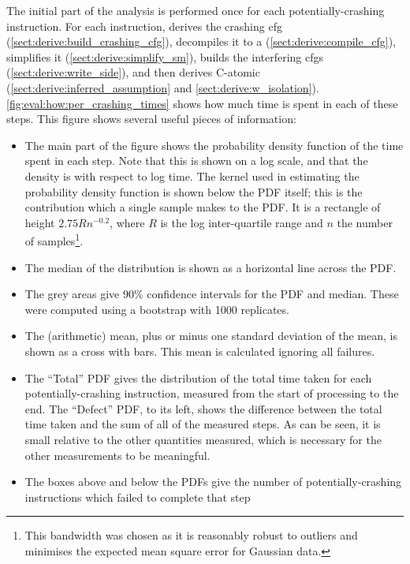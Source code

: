 \noindent
The initial part of the analysis is performed once for each
potentially-crashing instruction.  For each instruction, {\technique}
derives the crashing \gls{cfg}
(\autoref{sect:derive:build_crashing_cfg}), decompiles it to a
{\StateMachine} (\autoref{sect:derive:compile_cfg}), simplifies it
(\autoref{sect:derive:simplify_sm}), builds the interfering
\glspl{cfg} (\autoref{sect:derive:write_side}), and then derives
C-atomic (\autoref{sect:derive:inferred_assumption} and
\autoref{sect:derive:w_isolation}).
\autoref{fig:eval:how:per_crashing_times} shows how much time is spent
in each of these steps.  This figure shows several useful pieces of
information:
\begin{itemize}
\item The main part of the figure shows the probability density
  function of the time spent in each step.  Note that this is shown on
  a log scale, and that the density is with respect to log time.  The
  kernel used in estimating the probability density function is shown
  below the PDF itself; this is the contribution which a single sample
  makes to the PDF.  It is a rectangle of height $2.75Rn^{-0.2}$,
  where $R$ is the log inter-quartile range and $n$ the number of
  samples\footnote{This bandwidth was chosen as it is reasonably
    robust to outliers and minimises the expected mean square error
    for Gaussian data.}.  
\item The median of the distribution is shown as a horizontal line
  across the PDF.
\item The grey areas give 90\% confidence intervals for the PDF and
  median.  These were computed using a bootstrap with 1000 replicates.
\item The (arithmetic) mean, plus or minus one standard deviation of
  the mean, is shown as a cross with bars.  This mean is calculated
  ignoring all failures.  
\item The ``Total'' PDF gives the distribution of the total time taken
  for each potentially-crashing instruction, measured from the start
  of processing to the end.  The ``Defect'' PDF, to its left, shows
  the difference between the total time taken and the sum of all of
  the measured steps.  As can be seen, it is small relative to the
  other quantities measured, which is necessary for the other
  measurements to be meaningful.
\item The boxes above and below the PDFs give the number of
  potentially-crashing instructions which failed to complete that step

\end{itemize}
